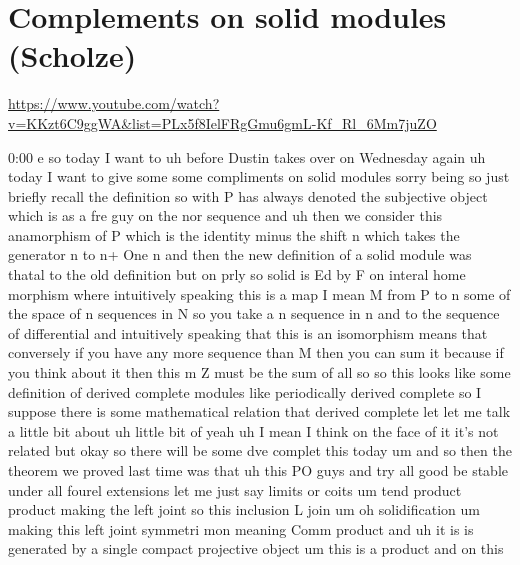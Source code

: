 
\section{\ufs Complements on solid modules (Scholze)}

\url{https://www.youtube.com/watch?v=KKzt6C9ggWA&list=PLx5f8IelFRgGmu6gmL-Kf_Rl_6Mm7juZO}
\renewcommand{\yt}[2]{\href{https://www.youtube.com/watch?v=KKzt6C9ggWA&list=PLx5f8IelFRgGmu6gmL-Kf_Rl_6Mm7juZO&t=#1}{#2}}
\vspace{1em}

\begin{unfinished}{0:00}
e  so  today  I  want  to  uh  before  Dustin
takes  over  on  Wednesday  again  uh  today  I
want  to  give  some  some  compliments  on
solid
modules  sorry
being  so  just  briefly  recall  the
definition  so  with  P  has  always  denoted
the  subjective  object  which  is  as  a  fre
guy  on  the  nor
sequence  and  uh  then  we  consider  this
anamorphism  of  P  which  is  the  identity
minus  the  shift
n  which  takes  the  generator  n  to  n+  One
n  and
then
the  new  definition  of  a  solid  module  was
thatal  to  the  old  definition  but  on  prly
so  solid
is  Ed  by  F  on  interal
home
morphism  where  intuitively  speaking  this
is  a  map  I  mean  M  from  P  to  n  some  of
the  space  of  n  sequences  in
N  so  you  take  a  n  sequence  in  n  and  to
the  sequence  of
differential  and  intuitively  speaking
that  this  is  an  isomorphism  means  that
conversely  if  you  have  any  more  sequence
than  M  then  you  can  sum  it  because  if
you  think  about  it  then  this  m  Z  must  be
the  sum  of
all  so  so  this  looks  like  some
definition  of  derived
complete  modules  like  periodically
derived  complete  so  I  suppose  there  is
some  mathematical  relation  that  derived
complete  let  let  me  talk  a  little  bit
about  uh  little  bit  of
yeah  uh
I  mean  I  think  on  the  face  of  it  it's
not  related  but  okay  so  there  will  be
some  dve  complet  this  today  um  and  so
then  the  theorem  we  proved  last  time  was
that  uh  this  PO  guys  and  try  all
good
be  stable  under  all
fourel
extensions  let  me  just  say  limits  or
coits
um  tend
product
product  making  the  left
joint  so  this  inclusion  L
join
um  oh
solidification  um  making  this  left  joint
symmetri  mon  meaning  Comm
product  and  uh  it  is  is
generated  by  a  single  compact  projective
object
um  this  is  a
product
and  on  this

\end{unfinished}
